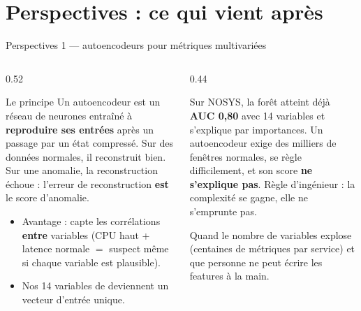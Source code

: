 \section{Perspectives : ce qui vient après}

\begin{frame}{Perspectives 1 --- autoencodeurs pour métriques multivariées}
\small
\begin{columns}[t]
\begin{column}{0.52\textwidth}
\begin{block}{Le principe}
Un autoencodeur est un réseau de neurones entraîné à \textbf{reproduire ses
entrées} après un passage par un état compressé. Sur des données normales,
il reconstruit bien. Sur une anomalie, la reconstruction échoue : l'erreur
de reconstruction \textbf{est} le score d'anomalie.
\begin{itemize}
\item Avantage : capte les corrélations \textbf{entre} variables (CPU haut
+ latence normale $=$ suspect même si chaque variable est plausible).
\item Nos 14 variables de  deviennent un vecteur
d'entrée unique.
\end{itemize}
\end{block}
\end{column}
\begin{column}{0.44\textwidth}
\begin{wbox}
Sur NOSYS, la forêt atteint déjà \textbf{AUC 0,80} avec 14 variables et
s'explique par importances. Un autoencodeur exige des milliers de fenêtres
normales, se règle difficilement, et son score \textbf{ne s'explique pas}.
Règle d'ingénieur : la complexité se gagne, elle ne s'emprunte pas.
\end{wbox}
\begin{ebox}
Quand le nombre de variables explose (centaines de métriques par service)
et que personne ne peut écrire les features à la main.
\end{ebox}
\end{column}
\end{columns}
\end{frame}

